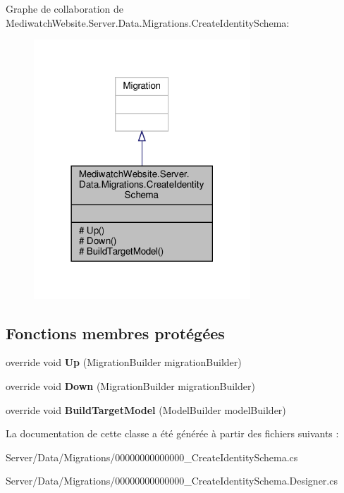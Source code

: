 Graphe de collaboration de Mediwatch\+Website.\+Server.\+Data.\+Migrations.\+Create\+Identity\+Schema\+:
\nopagebreak
\begin{figure}[H]
\begin{center}
\leavevmode
\includegraphics[width=230pt]{class_mediwatch_website_1_1_server_1_1_data_1_1_migrations_1_1_create_identity_schema__coll__graph}
\end{center}
\end{figure}
\subsection*{Fonctions membres protégées}
\begin{DoxyCompactItemize}
\item 
\mbox{\label{class_mediwatch_website_1_1_server_1_1_data_1_1_migrations_1_1_create_identity_schema_a8463d6d116a90f1f018b9f8ed60e272a}} 
override void {\bfseries Up} (Migration\+Builder migration\+Builder)
\item 
\mbox{\label{class_mediwatch_website_1_1_server_1_1_data_1_1_migrations_1_1_create_identity_schema_adc803467f0ad34f65738416b12b557b7}} 
override void {\bfseries Down} (Migration\+Builder migration\+Builder)
\item 
\mbox{\label{class_mediwatch_website_1_1_server_1_1_data_1_1_migrations_1_1_create_identity_schema_ae325d871e065f081fc9eada037994d7f}} 
override void {\bfseries Build\+Target\+Model} (Model\+Builder model\+Builder)
\end{DoxyCompactItemize}


La documentation de cette classe a été générée à partir des fichiers suivants \+:\begin{DoxyCompactItemize}
\item 
Server/\+Data/\+Migrations/00000000000000\+\_\+\+Create\+Identity\+Schema.\+cs\item 
Server/\+Data/\+Migrations/00000000000000\+\_\+\+Create\+Identity\+Schema.\+Designer.\+cs\end{DoxyCompactItemize}
